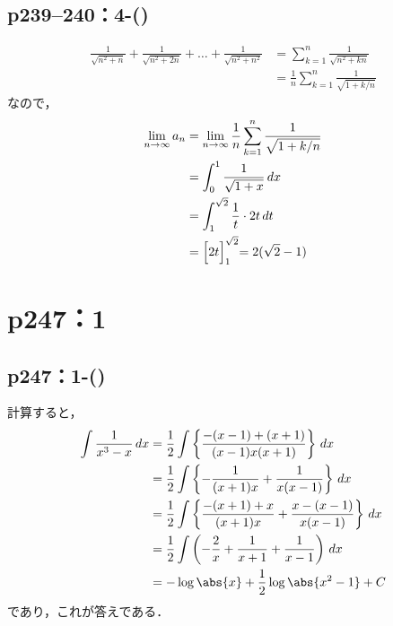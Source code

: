 \subsection*{p239--240：4-()}

\begin{tanswer}
    \begin{align*}
        \frac{1}{\sqrt{n^2+n}}+\frac{1}{\sqrt{n^2+2n}}+\dots+\frac{1}{\sqrt{n^2+n^2}} & = \sum_{k=1}^{n} \frac{1}{\sqrt{n^2+kn}}            \\
                                                                                      & = \frac{1}{n} \sum_{k=1}^{n} \frac{1}{\sqrt{1+k/n}}
    \end{align*}
    なので，
    \begin{align*}
        \lim_{n \to \infty} a_n & = \lim_{n \to \infty} \frac{1}{n} \sum_{k=1}^{n} \frac{1}{\sqrt{1+k/n}} \\
                                & =\int_{0}^{1} \frac{1}{\sqrt{1+x}} \, dx                                \\
                                & =\int_{1}^{\sqrt{2}} \frac{1}{t} \cdot 2t \, dt                         \\
                                & = \Bigl[2t \Bigl ]_{1}^{\sqrt{2}} =2(\sqrt{2}-1)
    \end{align*}
\end{tanswer}


\section*{p247：1}


\subsection*{p247：1-()}

\begin{tanswer}
    計算すると，
    \begin{align*}
        \int \frac{1}{x^3-x} \, dx & = \frac{1}{2} \int \left \{ \frac{-(x-1)+(x+1)}{(x-1)x(x+1)} \right \} \, dx                 \\
                                   & = \frac{1}{2} \int \left \{ -\frac{1}{(x+1)x}+\frac{1}{x(x-1)} \right \} \, dx               \\
                                   & = \frac{1}{2} \int \left \{ \frac{-(x+1)+x}{(x+1)x} + \frac{x-(x-1)}{x(x-1)} \right \} \, dx \\
                                   & = \frac{1}{2} \int \left ( -\frac{2}{x}+\frac{1}{x+1}+\frac{1}{x-1} \right) \, dx            \\
                                   & = -\log \abs{x} + \frac{1}{2} \log \abs{x^2-1}+ C
    \end{align*}
    であり，これが答えである．
\end{tanswer}


